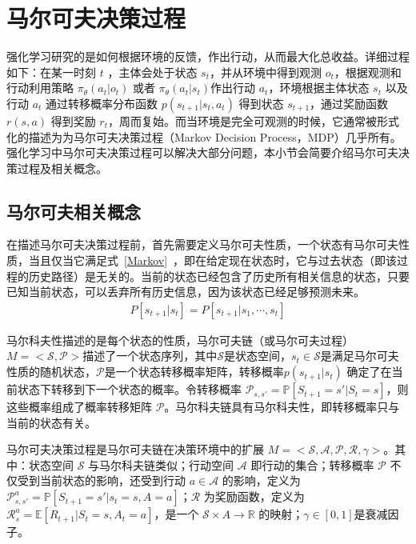 \section{马尔可夫决策过程}
强化学习研究的是如何根据环境的反馈，作出行动，从而最大化总收益。详细过程如下：在某一时刻 $t$ ，主体会处于状态 $s_t$，并从环境中得到观测 $o_t$，根据观测和行动利用策略 $\pi_\theta(a_t|o_t)$ 或者 $\pi_\theta(a_t|s_t)$作出行动 $a_t$，环境根据主体状态 $s_t$ 以及行动 $a_t$ 通过转移概率分布函数 $p(s_{t+1}| s_t, a_t)$ 得到状态 $s_{t+1}$，通过奖励函数 $r(s, a)$ 得到奖励 $r_t$，周而复始。而当环境是完全可观测的时候，它通常被形式化的描述为为马尔可夫决策过程（Markov Decision Process，MDP）几乎所有。强化学习中马尔可夫决策过程可以解决大部分问题\cite{Sutton1998ReinFORcementL}，本小节会简要介绍马尔可夫决策过程及相关概念。

\subsection{马尔可夫相关概念}

在描述马尔可夫决策过程前，首先需要定义马尔可夫性质，一个状态有马尔可夫性质，当且仅当它满足式~\eqref{Markov}~，即在给定现在状态时，它与过去状态（即该过程的历史路径）是无关的。当前的状态已经包含了历史所有相关信息的状态，只要已知当前状态，可以丢弃所有历史信息，因为该状态已经足够预测未来。
\begin{equation}
\label{Markov}
\begin{aligned}
P[s_{t+1}|s_t]=P[s_{t+1}|s_1,\cdots,s_t]
\end{aligned}
\end{equation}

马尔科夫性描述的是每个状态的性质，马尔可夫链（或马尔可夫过程）$M=<\mathcal{S}, \mathcal{P}>$描述了一个状态序列，其中$\mathcal{S}$是状态空间，$s_t \in \mathcal{S}$是满足马尔可夫性质的随机状态，$\mathcal{P}$是一个状态转移概率矩阵，转移概率$p(s_{t+1}|s_t)$ 确定了在当前状态下转移到下一个状态的概率。令转移概率 $\mathcal{P}_{s, s'}=\mathbb{P}[S_{t+1}=s'|S_t=s]$，则这些概率组成了概率转移矩阵 $\mathcal{P}$。马尔科夫链具有马尔科夫性，即转移概率只与当前的状态有关。

马尔可夫决策过程是马尔可夫链在决策环境中的扩展 $M=<\mathcal{S}, \mathcal{A}, \mathcal{P}, \mathcal{R}, \gamma>$。其中：状态空间 $\mathcal{S}$ 与马尔科夫链类似；行动空间 $\mathcal{A}$ 即行动的集合；转移概率 $\mathcal{P}$ 不仅受到当前状态的影响，还受到行动 $a\in \mathcal{A}$ 的影响，定义为$\mathcal{P}_{s, s'}^{a}=\mathbb{P}[S_{t+1}=s'|s_t=s, A=a]$；$\mathcal{R}$ 为奖励函数，定义为$\mathcal{R}_{s}^{a}=\mathbb{E}[R_{t+1}|S_t=s, A_t=a]$，是一个 $\mathcal{S}\times A\to \mathbb{R}$ 的映射；$\gamma \in [0,1]$是衰减因子。

